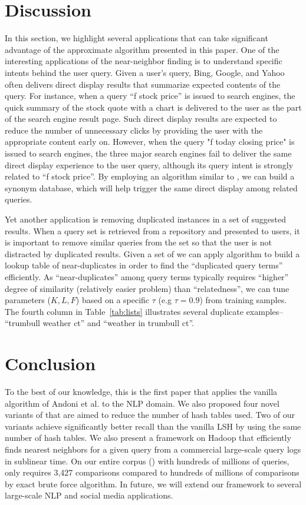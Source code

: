 \section{Discussion}
\label{sec:discuss}
In this section, we highlight several applications that can take significant advantage of the approximate \dflipb algorithm presented in this paper.
One of the interesting applications of the near-neighbor finding is to understand specific intents behind the user query. 
Given a user's query, Bing, Google, and Yahoo often delivers direct display results that summarize expected contents of the query. 
For instance, when a query ``f stock price'' is issued  to search engines, the quick summary of the stock quote with a chart is delivered 
to the user as the part of the search engine result page. 
Such direct display results are expected to reduce the number of unnecessary clicks by providing the user with the appropriate content early on. 
However, when the query "f today closing price" is issued to search engines, the three major search engines 
fail to deliver the same direct display experience to the user query, although its query intent is strongly related to ``f stock price''. 
By employing an algorithm similar to \dflipb, we can build a synonym database, 
which will help trigger the same direct display among related queries.

Yet another application is removing duplicated instances in a set of suggested results. 
When a query set is retrieved from a repository and presented to users, it is important to remove similar queries
from the set so that the user is not distracted by duplicated results. Given a set of
we can apply  \dflipb algorithm to build a lookup table of near-duplicates 
in order to find the ``duplicated query terms'' efficiently. 
As ``near-duplicates''  among query terms typically requires ``higher'' degree of similarity 
(relatively easier problem) than ``relatedness'', 
we can tune parameters ($K, L, F$) based on a specific $\tau$ (e.g $\tau=0.9$) from training samples. 
The fourth column in Table~\ref{tab:lists} illustrates several duplicate examples-- ``trumbull weather ct'' and ``weather in trumbull ct''.

\section{Conclusion}
\label{sec:conclusion}
To the best of our knowledge, this is the first paper that applies
the vanilla \lsh algorithm of Andoni et al. to the NLP domain. 
We also proposed four novel variants of \lsh that are aimed to reduce the number 
of hash tables used. Two of our variants achieve 
significantly better recall than the vanilla LSH by using the same number of hash tables. 
We also present a framework on Hadoop that efficiently finds nearest neighbors for a given query from a commercial 
large-scale query logs in sublinear time. On our entire corpus (\dataC) with hundreds of millions of queries, 
\dflipb only requires 3,427 comparisons compared to hundreds of millions of comparisons by exact brute force algorithm.
In future, we will extend our \lsh framework to several large-scale NLP and social media applications.  

